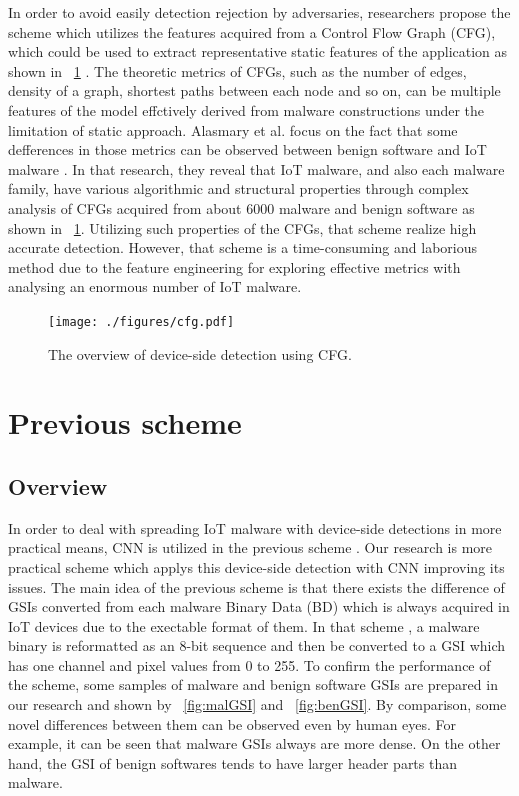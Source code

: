 \documentclass{ieeeaccess}
\begin{document}
In order to avoid easily detection rejection by adversaries, researchers propose the scheme which utilizes the features acquired from a Control Flow Graph (CFG), which could be used to extract representative static features of the application as shown in \figurename~\ref{fig:cfg} \cite{cfg, cfg2}.
The theoretic metrics of CFGs, such as the number of edges, density of a graph, shortest paths between each node and so on, can be multiple features of the model effctively derived from malware constructions under the limitation of static approach.
Alasmary et al. focus on the fact that some defferences in those metrics can be observed between benign software and IoT malware \cite{cfg}.
In that research, they reveal that IoT malware, and also each malware family, have various algorithmic and structural properties through complex analysis of CFGs acquired from about 6000 malware and benign software as shown in \figurename~\ref{fig:cfg}. 
Utilizing such properties of the CFGs, that scheme realize high accurate detection.
However, that scheme is a time-consuming and laborious method due to the feature engineering for exploring effective metrics with analysing an enormous number of IoT malware.

\begin{figure}[h]
 \centering
 \texttt{[image: ./figures/cfg.pdf]}
 \caption{The overview of device-side detection using CFG.} 
 \label{fig:cfg}
\end{figure}

\section{Previous scheme} \label{sec:previous_scheme}
\subsection{Overview} 
In order to deal with spreading IoT malware with device-side detections in more practical means, CNN is utilized in the previous scheme \cite{previous}.
Our research is more practical scheme which applys this device-side detection with CNN improving its issues.
The main idea of the previous scheme is that there exists the difference of GSIs converted from each malware Binary Data (BD) which is always acquired in IoT devices due to the exectable format of them.
In that scheme \cite{previous}, a malware binary is reformatted as an 8-bit sequence and then be converted to a GSI which has one channel and pixel values from 0 to 255.
To confirm the performance of the scheme, some samples of malware and benign software GSIs are prepared in our research and shown by \figurename~\ref{fig:malGSI} and \figurename~\ref{fig:benGSI}.
By comparison, some novel differences between them can be observed even by human eyes.
For example, it can be seen that malware GSIs always are more dense.
On the other hand, the GSI of benign softwares tends to have larger header parts than malware.
\end{document}
